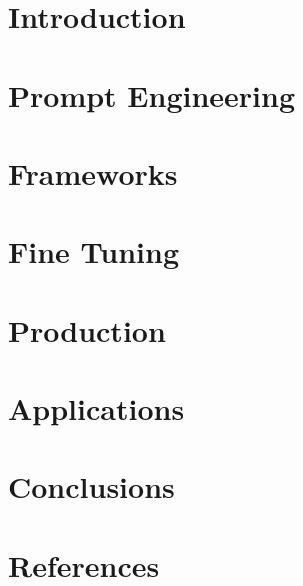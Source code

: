 \section[Intro]{Introduction}






\section[Prompts]{Prompt Engineering}


\section[Frameworks]{Frameworks}








\section[Consult]{Fine Tuning}


\section[Prod]{Production}


\section[Apps]{Applications}


\section[Concl]{Conclusions}





\section[Refs]{References}


